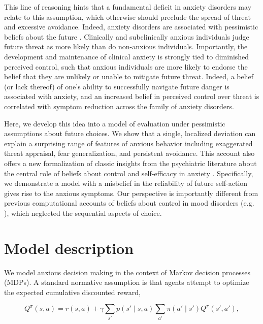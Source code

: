 \documentclass[11pt]{article} %
\begin{document}
This line of reasoning hints that a fundamental deficit in anxiety disorders may relate to this assumption, which otherwise should preclude the spread of threat and excessive avoidance. Indeed, anxiety disorders are associated with pessimistic beliefs about the future \citep{ClarkBeck2011}. Clinically and subclinically anxious individuals judge future threat as more likely than do non-anxious individuals\citep{ButlerMathews1983, ButlerMathews1987, MacleodByrne1996}. Importantly, the development and maintenance of clinical anxiety is strongly tied to diminished perceived control\citep{bandura1977, barlow2002, gallagher2014a}, such that anxious individuals are more likely to endorse the belief that they are unlikely or unable to mitigate future threat. Indeed, a belief (or lack thereof) of one's ability to successfully navigate future danger is associated with anxiety\citep{davey1996, dugas1997}, and an increased belief in perceived control over threat is correlated with symptom reduction across the family of anxiety disorders\citep{gallagher2014b}. 

Here, we develop this idea into a model of evaluation under pessimistic assumptions about future choices. We show that a single, localized deviation can explain a surprising range of features of anxious behavior including exaggerated threat appraisal, fear generalization, and persistent avoidance. This account also offers a new formalization of classic insights from the psychiatric literature about the central role of beliefs about control and self-efficacy in anxiety \citep{bandura1977, barlow2002}. Specifically, we demonstrate a model with a misbelief in the reliability of future self-action gives rise to the anxious symptoms. Our perspective is importantly different from previous computational accounts of beliefs about control in mood disorders (e.g. \cite{HuysDayan2009}), which neglected the sequential aspects of choice.

\section{Model description}

We model anxious decision making in the context of Markov decision processes (MDPs). A standard normative assumption is that agents attempt to optimize the expected cumulative discounted reward,

\begin{equation*}
Q^\pi(s,a) = r(s,a) + \gamma \sum_{s'} p(s' \mid s,a) \sum_{a'} \pi(a' \mid s') Q^\pi(s',a'),
\end{equation*}
\end{document}
